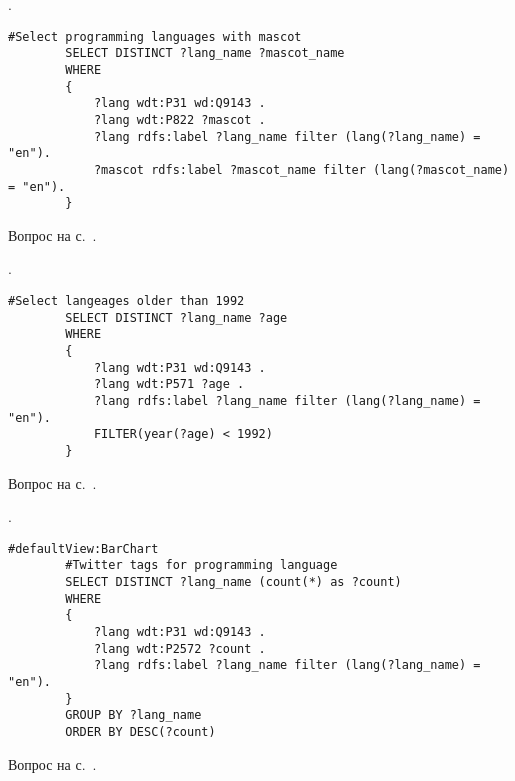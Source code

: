 \begin{task}
    \label{answer:prog_langs_4}
    . 
	\begin{lstlisting}[language=SPARQL, caption={{"Персонажи-талисманы" языков программирования}\protect\footnotemark}, label=lst:prog_lang_answer_4]
		#Select programming languages with mascot
		SELECT DISTINCT ?lang_name ?mascot_name
		WHERE
		{
		    ?lang wdt:P31 wd:Q9143 .
		    ?lang wdt:P822 ?mascot .
		    ?lang rdfs:label ?lang_name filter (lang(?lang_name) = "en").
		    ?mascot rdfs:label ?mascot_name filter (lang(?mascot_name) = "en").
		}
	\end{lstlisting}
    
    \small{Вопрос на с.~\pageref{prog_lang_task}.}
\end{task}

\begin{task}
    \label{answer:prog_langs_5}
    . 
	\begin{lstlisting}[language=SPARQL, caption={{Языки программирования, старше 1992 года}\protect\footnotemark}, label=lst:prog_lang_answer_5]
		#Select langeages older than 1992
		SELECT DISTINCT ?lang_name ?age
		WHERE
		{
		    ?lang wdt:P31 wd:Q9143 .
		    ?lang wdt:P571 ?age .
		    ?lang rdfs:label ?lang_name filter (lang(?lang_name) = "en").
		    FILTER(year(?age) < 1992)
		}
	\end{lstlisting}
    
    \small{Вопрос на с.~\pageref{prog_lang_task}.}
\end{task}

\begin{task}
    \label{answer:prog_langs_6}
    . 
	\begin{lstlisting}[language=SPARQL, caption={{Хештеги языков программирования в Твиттере}\protect\footnotemark}, label=lst:prog_lang_answer_6]
		#defaultView:BarChart
		#Twitter tags for programming language
		SELECT DISTINCT ?lang_name (count(*) as ?count)
		WHERE
		{
		    ?lang wdt:P31 wd:Q9143 .
		    ?lang wdt:P2572 ?count .
		    ?lang rdfs:label ?lang_name filter (lang(?lang_name) = "en"). 
		} 
		GROUP BY ?lang_name 
		ORDER BY DESC(?count)
	\end{lstlisting}
    
    \small{Вопрос на с.~\pageref{prog_lang_task}.}
\end{task}




